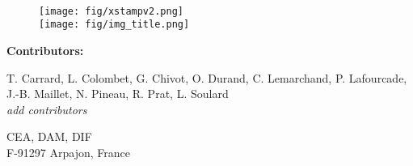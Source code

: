 \documentclass[12pt,a4paper]{article}
\begin{document}
\begin{titlepage}
  \hfill \Large \,
  
  \vspace*{5cm}
  
  \begin{figure}[!h]
    \centering
    \texttt{[image: fig/xstampv2.png]} \\
    \vspace{1cm}
    \texttt{[image: fig/img\_title.png]}    
  \end{figure}  

  \centering \Large \textbf{Contributors:}

  \begin{center}
    \normalsize
    T. Carrard, L. Colombet, G. Chivot, O. Durand, C. Lemarchand, P. Lafourcade, J.-B. Maillet, N. Pineau, R. Prat, L. Soulard \\ \textit{add contributors}
  \end{center}

  \vfill

  \centering \Large CEA, DAM, DIF \\
  \centering \Large F-91297 Arpajon, France  
\end{titlepage}

\newpage

\tableofcontents

\newpage

\newcommand{\currentdir}{01_introduction}


\renewcommand{\currentdir}{02_git}


\renewcommand{\currentdir}{03_operators}


\renewcommand{\currentdir}{04_coding_standards}


\renewcommand{\currentdir}{05_grid_cell_values}




\end{document}
